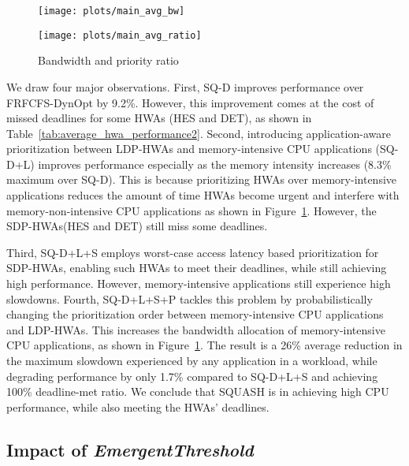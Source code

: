 \documentclass[10pt,letterpaper]{article}
\newcommand{\ldphwas}[0]{LDP-HWAs\xspace}
\newcommand{\sdphwas}[0]{SDP-HWAs\xspace}
\begin{document}
\begin{figure}[h]
\centering
  \begin{minipage}{0.40\textwidth}
    \centering
    \texttt{[image: plots/main\_avg\_bw]}
  \end{minipage}
  \begin{minipage}{0.40\textwidth}
    \centering
    \texttt{[image: plots/main\_avg\_ratio]}
  \end{minipage}
\caption{Bandwidth and priority ratio}
  \label{plot:bw_ratio_hwa}
\end{figure}


We draw four major observations. First, SQ-D improves performance over
FRFCFS-DynOpt by 9.2\%. However, this improvement comes at the cost of missed
deadlines for some HWAs (HES and DET), as shown in
Table~\ref{tab:average_hwa_performance2}. Second, introducing application-aware
prioritization between \ldphwas and memory-intensive CPU applications (SQ-D+L)
improves performance especially as the memory intensity increases (8.3\% maximum over SQ-D). 
This is because prioritizing HWAs over memory-intensive applications reduces 
the amount of time HWAs become urgent and interfere with memory-non-intensive CPU applications 
as shown in Figure~\ref{plot:bw_ratio_hwa}. However, the \sdphwas (HES and DET)
still miss some deadlines.

Third, SQ-D+L+S employs worst-case access latency based prioritization
for \sdphwas, enabling such HWAs to meet their deadlines, while still achieving
high performance. However, memory-intensive applications still experience high
slowdowns. Fourth, SQ-D+L+S+P tackles this problem by probabilistically
changing the prioritization order between memory-intensive CPU applications and
\ldphwas. This increases the bandwidth allocation of memory-intensive CPU
applications, as shown in Figure~\ref{plot:bw_ratio_hwa}. The result is a 26\% average reduction in the maximum slowdown experienced by any application in a workload,
while degrading performance by only 1.7\% compared to SQ-D+L+S and achieving
100\% deadline-met ratio. We conclude that SQUASH is in achieving high CPU
performance, while also meeting the HWAs' deadlines.





\subsection{Impact of \emph{EmergentThreshold}}\label{sec:sweeping_th}
\end{document}
